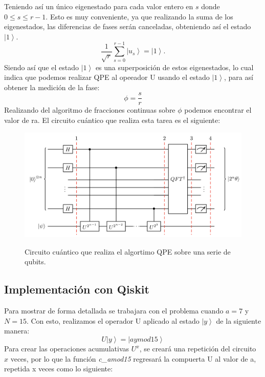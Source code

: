Teniendo así un único eigenestado para cada valor entero en $s$ donde $0\leq s \leq r-1$. Esto es muy conveniente, ya que realizando la suma de los eigenestados, las diferencias de fases
serán canceladas, obteniendo así el estado $ \left| 1 \right\rangle$.
\begin{equation*}
    \frac{1}{\sqrt{r}} \sum\limits_{s=0}^{r-1} \left|u_s \right\rangle =  \left| 1 \right\rangle.
\end{equation*}
Siendo así que el estado $ \left| 1 \right\rangle$ es una superposición de estos eigenestados, lo cual indica que podemos realizar 
QPE al opeeador U usando el estado $ \left| 1 \right\rangle$, para así obtener la medición de la fase:
\begin{equation*}
    \phi = \frac{s}{r}
\end{equation*}
Realizando del algoritmo de fracciones continuas sobre $\phi$ podemos encontrar el valor de ra. El circuito cuántico que realiza esta tarea es el siguiente:
\begin{figure}[H]
    \includegraphics[scale=0.4]{../Graphics/qpe.png}
    \label{fig:qpe}
    \caption{Circuito cuántico que realiza el algortimo QPE sobre una serie de qubits.}
\end{figure}
\subsection{Implementación con Qiskit}
Para mostrar de forma detallada se trabajara con el problema cuando $a=7$ y $N=15$. Con esto, realizamos el operador U aplicado al estado $\left|y \right\rangle$ de la siguiente manera:
\begin{equation}
    U\left| y \right\rangle = \left|aymod15 \right\rangle 
    \label{eq:ua15}
\end{equation}
Para crear las operaciones acumulativas $U^x$, se creará una repetición del circuito $x$ veces, por lo que la función \textit{c\_amod15}
 regresará la compuerta U al valor de a, repetida x veces como lo siguiente: